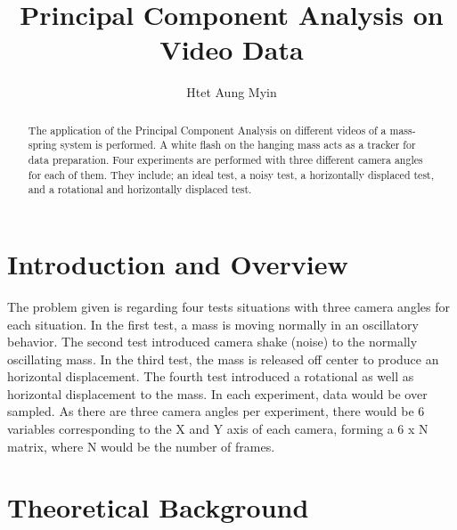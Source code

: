 \documentclass[a4paper,12pt]{article}
\begin{document}
\title{Principal Component Analysis on Video Data}
\author{Htet Aung Myin}
\maketitle
\begin{abstract}
The application of the Principal Component Analysis on different videos of a mass-spring system is performed. A white flash on the hanging mass acts as a tracker for data preparation. Four experiments are performed with three different camera angles for each of them. They include; an ideal test, a noisy test, a horizontally displaced test, and a rotational and horizontally displaced test.
\end{abstract}
\newpage
\section{Introduction and Overview}
The problem given is regarding four tests situations with three camera angles for each situation. In the first test, a mass is moving normally in an oscillatory behavior. The second test introduced camera shake (noise) to the normally oscillating mass. In the third test, the mass is released off center to produce an horizontal displacement. The fourth test introduced a rotational as well as horizontal displacement to the mass. In each experiment, data would be over sampled. As there are three camera angles per experiment, there would be 6 variables corresponding to the X and Y axis of each camera, forming a 6 x N matrix, where N would be the number of frames.
 
\section{Theoretical Background}
\end{document}
